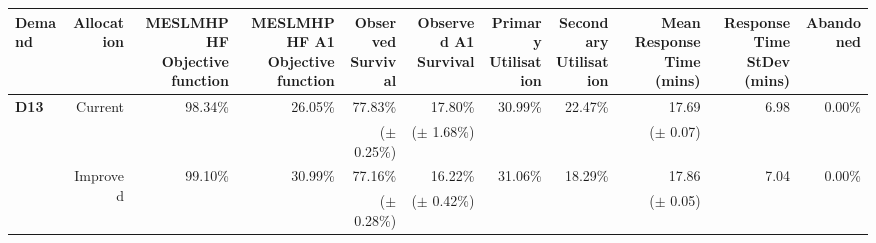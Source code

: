 \begin{tabular}{lrrrrrrrrrr}
\toprule
Demand                        & Allocation                & \specialcellr{MESLMHPHF\\ Objective function} & \specialcellr{MESLMHPHF A1\\Objective function} & \specialcellr{Observed\\Survival} & \specialcellr{Observed A1\\Survival} & \specialcellr{Primary\\Utilisation} & \specialcellr{Secondary\\Utilisation} & \specialcellr{Mean Response\\Time (mins)} &  \specialcellr{Response Time\\StDev (mins)} & Abandoned               \\
\midrule
\multirow{4}{*}{\textbf{D13}} & \multirow{2}{*}{Current}  & \multirow{2}{*}{98.34\%}                      & \multirow{2}{*}{26.05\%}                        & 77.83\%                           & 17.80\%                              & \multirow{2}{*}{30.99\%}            & \multirow{2}{*}{22.47\%}              & 17.69                                     & \multirow{2}{*}{6.98}                       & \multirow{2}{*}{0.00\%} \\
                              &                           &                                               &                                                 & ($\pm$ 0.25\%)                    & ($\pm$ 1.68\%)                       &                                     &                                       & ($\pm$ 0.07)                              &                                             &                         \\[2mm]
                              & \multirow{2}{*}{Improved} & \multirow{2}{*}{99.10\%}                      & \multirow{2}{*}{30.99\%}                        & 77.16\%                           & 16.22\%                              & \multirow{2}{*}{31.06\%}            & \multirow{2}{*}{18.29\%}              & 17.86                                     & \multirow{2}{*}{7.04}                       & \multirow{2}{*}{0.00\%} \\
                              &                           &                                               &                                                 & ($\pm$ 0.28\%)                    & ($\pm$ 0.42\%)                       &                                     &                                       & ($\pm$ 0.05)                              &                                             &                         \\

\end{tabular}

